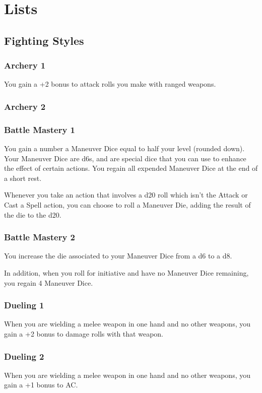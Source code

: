 \section{Lists} %
\subsection*{Fighting Styles} \label{ssec::fightingstyles}
\subsubsection{Archery 1}
    You gain a +2 bonus to attack rolls you make with ranged weapons.
\subsubsection{Archery 2}
\subsubsection{Battle Mastery 1}
    You gain a number a Maneuver Dice equal to half your level (rounded down).
    Your Maneuver Dice are d6s, and are special dice that you can use to enhance the effect of certain actions.
    You regain all expended Maneuver Dice at the end of a short rest.

    Whenever you take an action that involves a d20 roll which isn't the Attack or Cast a Spell action, you can choose to roll a Maneuver Die, adding the result of the die to the d20.
\subsubsection{Battle Mastery 2}
    You increase the die associated to your Maneuver Dice from a d6 to a d8.

    In addition, when you roll for initiative and have no Maneuver Dice remaining, you regain 4 Maneuver Dice.
\subsubsection{Dueling 1}
    When you are wielding a melee weapon in one hand and no other weapons, you gain a +2 bonus to damage rolls with that weapon.
\subsubsection{Dueling 2}
    When you are wielding a melee weapon in one hand and no other weapons, you gain a +1 bonus to AC.
